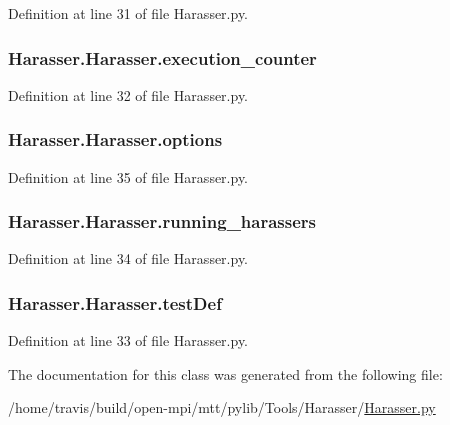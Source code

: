 Definition at line 31 of file Harasser.\-py.

\hypertarget{class_harasser_1_1_harasser_a96c7c91ef5d33784056c567ba49a2c8a}{
\subsubsection[{execution\-\_\-counter}]{\setlength{\rightskip}{0pt plus 5cm}Harasser.\-Harasser.\-execution\-\_\-counter}}\label{class_harasser_1_1_harasser_a96c7c91ef5d33784056c567ba49a2c8a}


Definition at line 32 of file Harasser.\-py.

\hypertarget{class_harasser_1_1_harasser_ab9ed73d71cdaae7d9b5cc81548823527}{
\subsubsection[{options}]{\setlength{\rightskip}{0pt plus 5cm}Harasser.\-Harasser.\-options}}\label{class_harasser_1_1_harasser_ab9ed73d71cdaae7d9b5cc81548823527}


Definition at line 35 of file Harasser.\-py.

\hypertarget{class_harasser_1_1_harasser_ad9d37d39c99222e899af613a573ecd15}{
\subsubsection[{running\-\_\-harassers}]{\setlength{\rightskip}{0pt plus 5cm}Harasser.\-Harasser.\-running\-\_\-harassers}}\label{class_harasser_1_1_harasser_ad9d37d39c99222e899af613a573ecd15}


Definition at line 34 of file Harasser.\-py.

\hypertarget{class_harasser_1_1_harasser_adddf34aabbc91934437e1a30134224c3}{
\subsubsection[{test\-Def}]{\setlength{\rightskip}{0pt plus 5cm}Harasser.\-Harasser.\-test\-Def}}\label{class_harasser_1_1_harasser_adddf34aabbc91934437e1a30134224c3}


Definition at line 33 of file Harasser.\-py.



The documentation for this class was generated from the following file\-:\begin{DoxyCompactItemize}
\item 
/home/travis/build/open-\/mpi/mtt/pylib/\-Tools/\-Harasser/\hyperlink{_harasser_8py}{Harasser.\-py}\end{DoxyCompactItemize}
